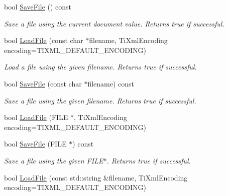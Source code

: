 \begin{DoxyCompactItemize}
\item 
\mbox{\label{class_ti_xml_document_ab63b96a6af5a467e289c7c75202edad9}} 
bool \hyperlink{class_ti_xml_document_ab63b96a6af5a467e289c7c75202edad9}{Save\+File} () const
\begin{DoxyCompactList}\small\item\em Save a file using the current document value. Returns true if successful. \end{DoxyCompactList}\item 
\mbox{\label{class_ti_xml_document_a879cdf5e981b8b2d2ef82f2546dd28fb}} 
bool \hyperlink{class_ti_xml_document_a879cdf5e981b8b2d2ef82f2546dd28fb}{Load\+File} (const char $\ast$filename, Ti\+Xml\+Encoding encoding=T\+I\+X\+M\+L\+\_\+\+D\+E\+F\+A\+U\+L\+T\+\_\+\+E\+N\+C\+O\+D\+I\+NG)
\begin{DoxyCompactList}\small\item\em Load a file using the given filename. Returns true if successful. \end{DoxyCompactList}\item 
\mbox{\label{class_ti_xml_document_ae641f33784381017c44e107cc2c86b5c}} 
bool \hyperlink{class_ti_xml_document_ae641f33784381017c44e107cc2c86b5c}{Save\+File} (const char $\ast$filename) const
\begin{DoxyCompactList}\small\item\em Save a file using the given filename. Returns true if successful. \end{DoxyCompactList}\item 
bool \hyperlink{class_ti_xml_document_a41f6fe7200864d1dca663d230caf8db6}{Load\+File} (F\+I\+LE $\ast$, Ti\+Xml\+Encoding encoding=T\+I\+X\+M\+L\+\_\+\+D\+E\+F\+A\+U\+L\+T\+\_\+\+E\+N\+C\+O\+D\+I\+NG)
\item 
\mbox{\label{class_ti_xml_document_a8f5a1022168a5767e32becec7b6f44ee}} 
bool \hyperlink{class_ti_xml_document_a8f5a1022168a5767e32becec7b6f44ee}{Save\+File} (F\+I\+LE $\ast$) const
\begin{DoxyCompactList}\small\item\em Save a file using the given F\+I\+L\+E$\ast$. Returns true if successful. \end{DoxyCompactList}\item 
bool \hyperlink{class_ti_xml_document_a18ae6ed34fed7991ebc220862dfac884}{Load\+File} (const std\+::string \&filename, Ti\+Xml\+Encoding encoding=T\+I\+X\+M\+L\+\_\+\+D\+E\+F\+A\+U\+L\+T\+\_\+\+E\+N\+C\+O\+D\+I\+NG)

\end{DoxyCompactItemize}
